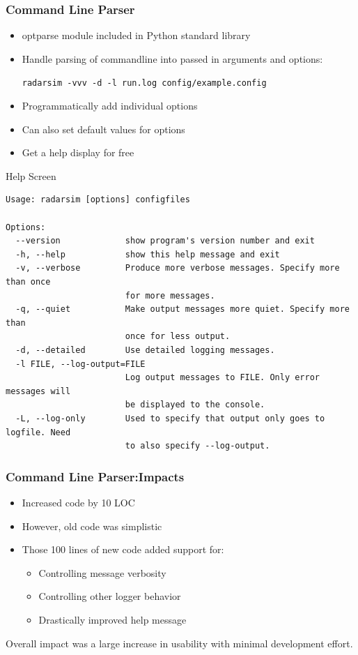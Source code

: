 \documentclass[red, hyperref={pdfpagelabels=false}]{beamer}
\begin{document}
\begin{frame}[fragile]
  \lstset{language=Python}
  \frametitle{Command Line Parser}
  \begin{itemize}
    \item optparse module included in Python standard library
    \item Handle parsing of commandline into passed in arguments and options:

    \verb$radarsim -vvv -d -l run.log config/example.config$
    \item Programmatically add individual options
    
    \item Can also set default values for options
    \item Get a help display for free
  \end{itemize}
\end{frame}

\begin{frame}[fragile]{Help Screen}
\tiny
\begin{verbatim}
Usage: radarsim [options] configfiles

Options:
  --version             show program's version number and exit
  -h, --help            show this help message and exit
  -v, --verbose         Produce more verbose messages. Specify more than once
                        for more messages.
  -q, --quiet           Make output messages more quiet. Specify more than
                        once for less output.
  -d, --detailed        Use detailed logging messages.
  -l FILE, --log-output=FILE
                        Log output messages to FILE. Only error messages will
                        be displayed to the console.
  -L, --log-only        Used to specify that output only goes to logfile. Need
                        to also specify --log-output.
\end{verbatim}
\end{frame}

\begin{frame}
  \frametitle{Command Line Parser:Impacts}
  \begin{itemize}
    \item Increased code by 10 LOC
    \item However, old code was simplistic
    \item Those 100 lines of new code added support for:
    \begin{itemize}
      \item Controlling message verbosity
      \item Controlling other logger behavior
      \item Drastically improved help message
    \end{itemize}
  \end{itemize}
  Overall impact was a large increase in usability with minimal development effort.
\end{frame}
\end{document}
